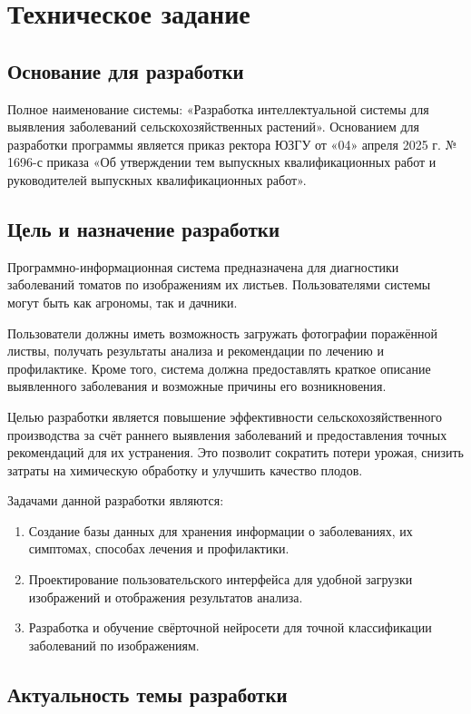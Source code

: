 \section{Техническое задание}
\subsection{Основание для разработки}

Полное наименование системы: «Разработка интеллектуальной системы для выявления заболеваний сельскохозяйственных растений». Основанием для разработки программы является приказ ректора ЮЗГУ от «04» апреля 2025 г. № 1696-с приказа «Об утверждении тем выпускных квалификационных работ и руководителей выпускных квалификационных работ».

\subsection{Цель и назначение разработки}

Программно-информационная система предназначена для диагностики заболеваний томатов по изображениям их листьев. Пользователями системы могут быть как агрономы, так и дачники.

Пользователи должны иметь возможность загружать фотографии поражённой листвы, получать результаты анализа и рекомендации по лечению и профилактике. Кроме того, система должна предоставлять краткое описание выявленного заболевания и возможные причины его возникновения.

Целью разработки является повышение эффективности сельскохозяйственного производства за счёт раннего выявления заболеваний и предоставления точных рекомендаций для их устранения. Это позволит сократить потери урожая, снизить затраты на химическую обработку и улучшить качество плодов.

Задачами данной разработки являются:
\begin{enumerate}
	\item Создание базы данных для хранения информации о заболеваниях, их симптомах, способах лечения и профилактики.
	\item Проектирование пользовательского интерфейса для удобной загрузки изображений и отображения результатов анализа.
	\item Разработка и обучение свёрточной нейросети для точной классификации заболеваний по изображениям.
\end{enumerate}

\subsection{Актуальность темы разработки}

